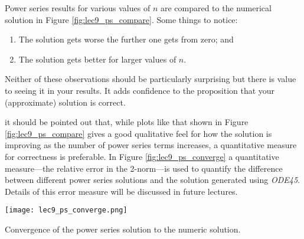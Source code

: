 Power series results for various values of $n$ are compared to the numerical solution in Figure \ref{fig:lec9_ps_compare}.  Some things to notice:
\begin{enumerate}
\item The solution gets worse the further one gets from zero; and
\item The solution gets better for larger values of $n$.  
\end{enumerate}
Neither of these observations should be particularly surprising but there is value to seeing it in your results. It adds confidence to the proposition that your (approximate) solution is correct.

 it should be pointed out that, while plots like that shown in Figure \ref{fig:lec9_ps_compare} gives a good qualitative feel for how the solution is improving as the number of power series terms increases, a quantitative measure for correctness is preferable.  In Figure \ref{fig:lec9_ps_converge} a quantitative measure---the relative error in the 2-norm---is used to quantify the difference between different power series solutions and the solution generated using \emph{ODE45}.  Details of this error measure will be discussed in future lectures.
\begin{marginfigure}
\texttt{[image: lec9\_ps\_converge.png]}
\caption{Convergence of the power series solution to the numeric solution.}
\label{fig:lec9_ps_converge}
\end{marginfigure}   

